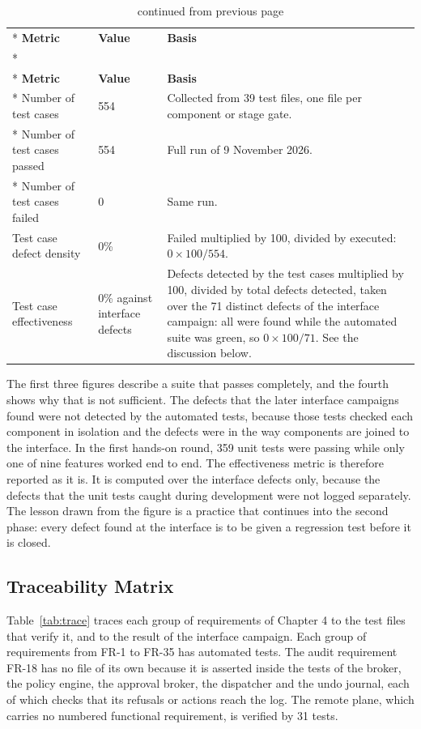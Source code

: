 \documentclass{FastFyp}
\begin{document}
{
\begin{longtable}{|p{4.6cm}|p{2.0cm}|p{6.6cm}|}
\caption{Test metrics.}\label{tab:metrics}\\*
\hline
\textbf{Metric} & \textbf{Value} & \textbf{Basis} \\*
\hline
\endfirsthead
\caption[]{continued from previous page}\\*
\hline
\textbf{Metric} & \textbf{Value} & \textbf{Basis} \\*
\hline
\endhead
\hline
Number of test cases & 554 & Collected from 39 test files, one file per component or stage gate. \\*
\hline
Number of test cases passed & 554 & Full run of 9 November 2026. \\*
\hline
Number of test cases failed & 0 & Same run. \\
\hline
Test case defect density & 0\% & Failed multiplied by 100, divided by executed: $0 \times 100 / 554$. \\
\hline
Test case effectiveness & 0\% against interface defects & Defects detected by the test cases multiplied by 100, divided by total defects detected, taken over the 71 distinct defects of the interface campaign: all were found while the automated suite was green, so $0 \times 100 / 71$. See the discussion below. \\
\hline
\end{longtable}
}

The first three figures describe a suite that passes completely, and the fourth shows why that is not sufficient. The defects that the later interface campaigns found were not detected by the automated tests, because those tests checked each component in isolation and the defects were in the way components are joined to the interface. In the first hands-on round, 359 unit tests were passing while only one of nine features worked end to end. The effectiveness metric is therefore reported as it is. It is computed over the interface defects only, because the defects that the unit tests caught during development were not logged separately. The lesson drawn from the figure is a practice that continues into the second phase: every defect found at the interface is to be given a regression test before it is closed.

\subsection{Traceability Matrix}
Table~\ref{tab:trace} traces each group of requirements of Chapter 4 to the test files that verify it, and to the result of the interface campaign. Each group of requirements from FR-1 to FR-35 has automated tests. The audit requirement FR-18 has no file of its own because it is asserted inside the tests of the broker, the policy engine, the approval broker, the dispatcher and the undo journal, each of which checks that its refusals or actions reach the log. The remote plane, which carries no numbered functional requirement, is verified by 31 tests.
\end{document}
